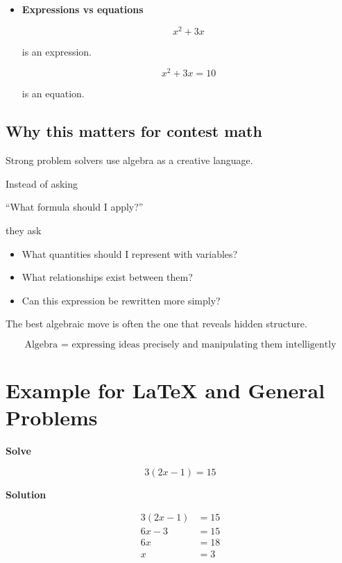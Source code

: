 \documentclass[11pt]{article}
\begin{document}
\begin{bluebox}
\begin{itemize}
but

\[
a-b \ne b-a
\]

\item \textbf{Expressions vs equations}

\[
x^2+3x
\]

is an expression.

\[
x^2+3x=10
\]

is an equation.

\end{itemize}

\subsection*{Why this matters for contest math}

Strong problem solvers use algebra as a creative language.

Instead of asking

\begin{center}
“What formula should I apply?”
\end{center}

they ask

\begin{itemize}

\item What quantities should I represent with variables?
\item What relationships exist between them?
\item Can this expression be rewritten more simply?

\end{itemize}

The best algebraic move is often the one that reveals hidden structure.

\[
\text{Algebra = expressing ideas precisely and manipulating them intelligently}
\]

\end{bluebox}




\section*{Example for LaTeX and General Problems}

\textbf{Solve}

\[
3(2x-1)=15
\]

\textbf{Solution}

\[
\begin{aligned}
3(2x-1) &= 15 \\
6x-3 &= 15 \\
6x &= 18 \\
x &= 3
\end{aligned}
\]
\end{document}
